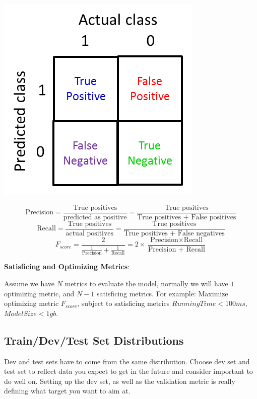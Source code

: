 \documentclass{article}
\begin{document}
\begin{center}
\includegraphics[scale=0.6]{./images/precision_recall.png}
\end{center}

\[\text{Precision} = \frac{\text{True positives}}{\text{predicted as positive}} = \frac{\text{True positives}}{\text{True positives + False positives}}\]
\[\text{Recall} = \frac{\text{True positives}}{\text{actual positives}} = \frac{\text{True positives}}{\text{True positives + False negatives}}\]
\[F_{score} = \frac{2}{\frac{1}{\text{Precision}} + \frac{1}{\text{Recall}}} = 2 \times \frac{\text{Precision} \times \text{Recall}}{\text{Precision + Recall}}\]

\noindent \textbf{Satisficing and Optimizing Metrics}:

\noindent Assume we have \(N\) metrics to evaluate the model, normally we will have \(1\) optimizing metric, and \(N - 1\) satisficing metrics. For example: Maximize optimizing metric \(F_{score}\), subject to satisficing metrics \(RunningTime < 100ms\), \(ModelSize < 1gb\).

\subsection{Train/Dev/Test Set Distributions}

Dev and test sets have to come from the same distribution. Choose dev set and test set to reflect data you expect to get in the future and consider important to do well on. Setting up the dev set, as well as the validation metric is really defining what target you want to aim at.
\end{document}

